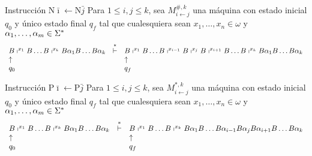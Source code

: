 \begin{frame}
  \begin{block}{Instrucción $\mathrm{N}\bar{\imath} \leftarrow \mathrm{N}\bar{j}$}
    \PN Para $1 \leq i,j \leq k$, sea $M_{i \leftarrow j}^{\#,k}$ una máquina con estado inicial $q_{0}$ y único estado
    final $q_{f}$ tal que cualesquiera sean $x_{1}, \dotsc, x_{n} \in \omega$ y $\alpha_{1}, \dotsc,\alpha_{m} \in
    \Sigma^{\ast}$
    \minLetter
    \[
      \begin{array}{lcl}
        B \shortmid^{x_{1}} B \dotsc B \shortmid^{x_{k}} B \alpha_{1} B \dotsc B \alpha_{k} &\overset{\ast}{\vdash}& B
          \shortmid^{x_{1}} B \dotsc B \shortmid^{x_{i-1}} B \shortmid^{x_{j}} B \shortmid^{x_{i+1}} B \dotsc B
          \shortmid^{x_{k}} B \alpha_{1} B \dotsc B \alpha_{k} \\
        \uparrow && \uparrow \\
        q_{0} & & q_{f}
      \end{array}
    \]
  \end{block}

  \begin{block}{Instrucción $\mathrm{P}\bar{\imath} \leftarrow \mathrm{P}\bar{j}$}
    \PN Para $1 \leq i,j \leq k$, sea $M_{i \leftarrow j}^{\ast,k}$ una máquina con estado inicial $q_{0}$ y único
    estado final $q_{f}$ tal que cualesquiera sean $x_{1}, \dotsc, x_{n} \in \omega$ y $\alpha_{1}, \dotsc,\alpha_{m}
    \in \Sigma^{\ast}$
    \minLetter
    \[
      \begin{array}{lcl}
        B \shortmid^{x_{1}} B \dotsc B \shortmid^{x_{k}} B \alpha_{1} B \dotsc B \alpha_{k} &\overset{\ast}{\vdash}& B
          \shortmid^{x_{1}} B \dotsc B \shortmid^{x_{k}} B \alpha_{1} B \dotsc B \alpha_{i-1} B \alpha_{j} B
          \alpha_{i+1} B \dotsc B \alpha_{k} \\
        \uparrow && \uparrow \\
        q_{0} & & q_{f}
      \end{array}
    \]
  \end{block}
\end{frame}
